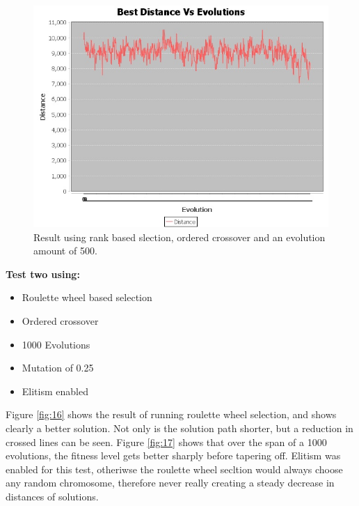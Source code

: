 \documentclass[article]{IEEEtran}
\begin{document}
\begin{figure}[H]
\centering
  \includegraphics[width=.8\linewidth]{images/bestDistances1}
  \caption{Result using rank based slection, ordered crossover and an evolution amount of 500.}
  \label{fig:15}
\end{figure}

\textbf{Test two using:} 
\begin{itemize}
\item Roulette wheel based selection
\item Ordered crossover
\item 1000 Evolutions
\item Mutation of 0.25
\item Elitism enabled
\end{itemize} 

Figure \ref{fig:16} shows the result of running roulette wheel selection, and shows clearly a better solution. Not only is the solution path shorter, but a reduction in crossed lines can be seen. Figure \ref{fig:17} shows that over the span of a 1000 evolutions, the fitness level gets better sharply before tapering off. Elitism was enabled for this test, otheriwse the roulette wheel secltion would always choose any random chromosome, therefore never really creating a steady decrease in distances of solutions.
\end{document}
